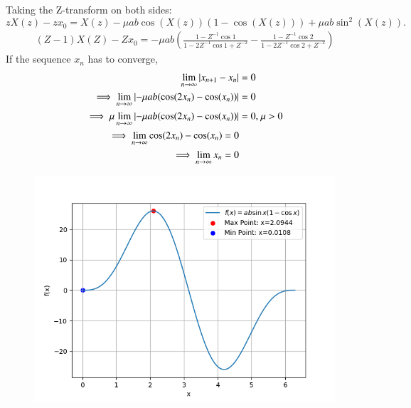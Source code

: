 \documentclass[journal]{IEEEtran}
\begin{document}
	Taking the Z-transform on both sides:
	\[
	zX(z) - zx_0 = X(z) - \mu ab \cos(X(z))(1 - \cos(X(z))) + \mu ab \sin^2(X(z)).
	\]
	\begin{align}
		(Z-1)X(Z)-Zx_{0}=-{\mu}ab\left(\frac{1-Z^{-1}\cos{1}}{1-2Z^{-1}\cos{1}+Z^{-2}}-\frac{1-Z^{-1}\cos{2}}{1-2Z^{-1}\cos{2}+Z^{-2}}\right)
	\end{align}
	If the sequence $x_n$ has to converge,
	\begin{align}
		\lim_{n\to\infty} \left\vert x_{n + 1} - x_n\right\vert &= 0\\
		\implies \lim_{n\to\infty} \left\vert-{\mu}ab(\cos(2x_{n})-\cos(x_{n}))\right\vert &= 0\\
		\implies \mu \lim_{n\to\infty} \left\vert-{\mu}ab(\cos(2x_{n})-\cos(x_{n}))\right\vert &= 0 \text{, } \mu > 0\\
		\implies \lim_{n\to\infty} \cos(2x_{n})-\cos(x_{n}) = 0\\
		\implies \lim_{n\to\infty} x_{n} = 0
	\end{align}
	\begin{figure}[h!]
		\centering
		\includegraphics[width=0.7\columnwidth]{figs/Fig1.png}
		\label{label}
	\end{figure}
	
\end{document}
